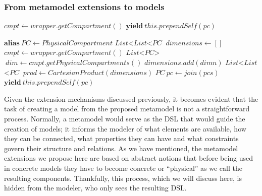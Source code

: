 \subsubsection{From metamodel extensions to models}

\begin{algorithm}[t]
\caption{Produce Physical Compartments of Group}
\label{alg:group}
\begin{algorithmic}
    \State $cmpt \gets wrapper.getCompartment()$ 
        \State $\textbf{yield} \: this.prependSelf(pc)$
    \EndFor
\EndFor
\EndProcedure
\end{algorithmic}
\end{algorithm}

\begin{algorithm}[t]
\caption{Produce Physical Compartments of Product}
\label{alg:product}
\begin{algorithmic}
\State $\textbf{alias} \: PC \gets PhysicalCompartment$
\State $List$<$List$<$PC$\text{>}\text{>} $ \: dimensions \gets []$
    \State $cmpt \gets wrapper.getCompartment()$
    \State $List$<$PC$>$ \: dim \gets cmpt.getPhysicalCompartments()$
    \State $dimensions.add(dimn)$
\EndFor
\State $List$<$List$<$PC$\text{>}\text{>} $\:prod \gets CartesianProduct(dimensions)$
    \State $PC \: pc \gets join(pcs)$
    \State $\textbf{yield} \: this.prependSelf(pc)$
\EndFor
\EndProcedure
\end{algorithmic}
\end{algorithm}

Given the extension mechanisms discussed previously, it becomes evident that the task of creating a model from the proposed metamodel is not a straightforward process. Normally, a metamodel would serve as the DSL that would guide the creation of models; it informs the modeler of what elements are available, how they can be connected, what properties they can have and what constraints govern their structure and relations. As we have mentioned, the metamodel extensions we propose here are based on abstract notions that before being used in concrete models they have to become concrete or ``physical'' as we call the resulting components. Thankfully, this process, which we will discuss here, is hidden from the modeler, who only sees the resulting DSL.

